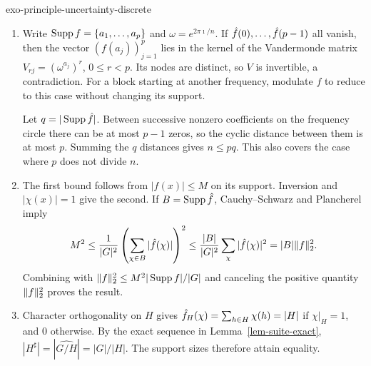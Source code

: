 \begin{correction}{exo-principle-uncertainty-discrete}
\begin{enumerate}
\item Write $\operatorname{Supp} f=\{a_1,\ldots,a_p\}$ and
$\omega=e^{2\pi\imath/n}$. If $\hat{f}(0),\ldots,\hat{f}(p-1)$ all vanish,
then the vector $(f(a_j))_{j=1}^p$ lies in the kernel of the Vandermonde matrix
$V_{rj}=(\omega^{a_j})^r$, $0\leq r<p$. Its nodes are distinct, so $V$ is
invertible, a contradiction. For a block starting at another frequency,
modulate $f$ to reduce to this case without changing its support.

Let $q=|\operatorname{Supp}\hat{f}|$. Between successive nonzero coefficients on the frequency
circle there can be at most $p-1$ zeros, so the cyclic distance between them
is at most $p$. Summing the $q$ distances gives $n\leq pq$.
This also covers the case where $p$ does not divide $n$.
\item The first bound follows from $|f(x)|\leq M$ on its support.
Inversion and $|\chi(x)|=1$ give the second. If $B=\operatorname{Supp}\hat{f}$,
Cauchy--Schwarz and Plancherel imply
\[
 M^2\leq\frac1{|G|^2}\left(\sum_{\chi\in B}|\hat{f}(\chi)|\right)^2
 \leq\frac{|B|}{|G|^2}\sum_\chi|\hat{f}(\chi)|^2
 =|B|\lVert f\rVert_2^2.
\]
Combining with $\lVert f\rVert_2^2\leq M^2|\operatorname{Supp} f|/|G|$ and canceling the positive
quantity $\lVert f\rVert_2^2$ proves the result.
\item Character orthogonality on $H$ gives
$\hat{f}_H(\chi)=\sum_{h\in H}\chi(h)=|H|$ if $\chi|_H=1$, and $0$ otherwise.
By the exact sequence in Lemma~\ref{lem-suite-exact},
$|H^\sharp|=|\widehat{G/H}|=|G|/|H|$.
The support sizes therefore attain equality.
\end{enumerate}
\end{correction}
